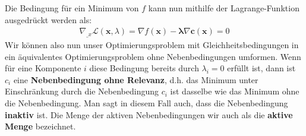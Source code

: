 \documentclass{report}
\newcommand{\tbf}{\textbf}
\newcommand*{\newpar}{\par\vspace{\baselineskip}\noindent}
\begin{document}
\newpar
Die Bedingung für ein Minimum von $f$ kann nun mithilfe der Lagrange-Funktion ausgedrückt werden als:
\begin{align*}
 \nabla_{\bm_x} \mathcal{L}(\bm{x}, \lambda) = \nabla f(\bm{x}) - \bm{\lambda} \nabla \bm{c}(\bm{x}) = 0
\end{align*}
Wir können also nun unser Optimierungsproblem mit Gleichheitsbedingungen in ein äquivalentes Optimierungsproblem ohne Nebenbedingungen umformen. Wenn für eine Komponente $i$ diese Bedingung bereits durch $\lambda_i = 0$ erfüllt ist, dann ist $c_i$ eine \tbf{Nebenbedingung ohne Relevanz}, d.h. das Minimum unter Einschränkung durch die Nebenbedingung $c_i$ ist dasselbe wie das Minimum ohne die Nebenbedingung. Man sagt in diesem Fall auch, dass die Nebenbedingung \tbf{inaktiv} ist. Die Menge der aktiven Nebenbedingungen wir auch als die \tbf{aktive Menge} bezeichnet.
%
\end{document}
